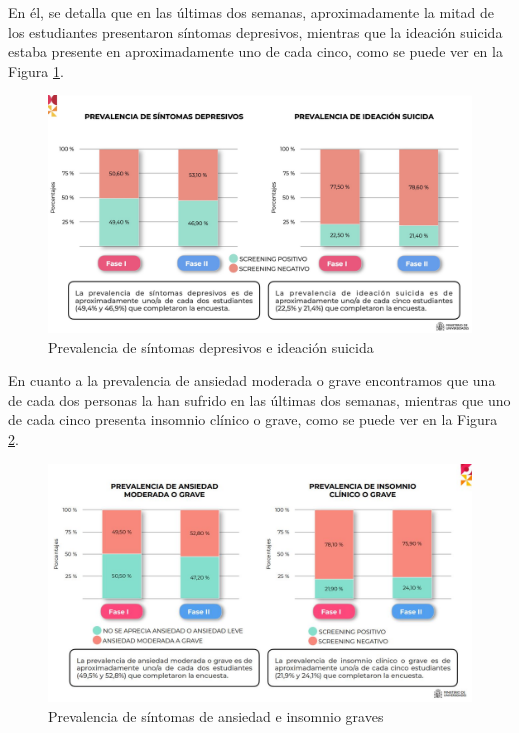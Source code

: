     En él, se detalla que en las últimas dos semanas, aproximadamente la mitad de los estudiantes presentaron síntomas depresivos, mientras que la ideación suicida estaba presente en aproximadamente uno de cada cinco, como se puede ver en la Figura \ref{fig:intro:sintomas_depresivos_suicida}. 
    
    \begin{figure}[h]
        \centering
        \includegraphics[width=0.75\linewidth]{figures/Sintomas depresion suicidio.jpg}
        \caption[Prevalencia de síntomas depresivos e ideación suicida]{Prevalencia de síntomas depresivos e ideación suicida \cite{ministerio_de_universidades_salud_2023}}
        \label{fig:intro:sintomas_depresivos_suicida}
    \end{figure}
    
    En cuanto a la prevalencia de ansiedad moderada o grave encontramos que una de cada dos personas la han sufrido en las últimas dos semanas, mientras que uno de cada cinco presenta insomnio clínico o grave, como se puede ver en la Figura \ref{fig:intro:sintomas_ansiedad_insomnio}. 
    
    \begin{figure}[h]
        \centering
        \includegraphics[width=0.75\linewidth]{figures/Sintomas ansiedad insomnio.JPG}
        \caption[Prevalencia de síntomas de ansiedad e insomnio graves]{Prevalencia de síntomas de ansiedad e insomnio graves \cite{ministerio_de_universidades_salud_2023}}
        \label{fig:intro:sintomas_ansiedad_insomnio}
    \end{figure}
    
